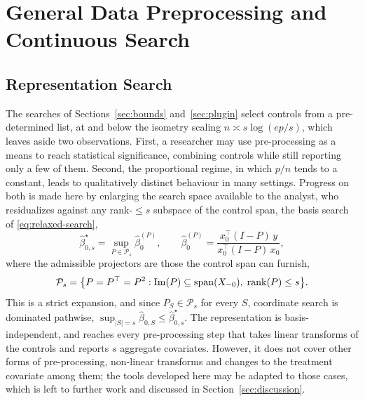 \section{General Data Preprocessing and Continuous Search}
\label{sec:continuous-relaxation}

%

\subsection{Representation Search}


The searches of Sections~\ref{sec:bounds} and~\ref{sec:plugin} select
controls from a pre-determined list, at and below the
isometry scaling $n \asymp s \log(ep/s)$, which leaves aside two
observations. First, a researcher may use pre-processing as a means to
reach statistical significance, combining controls while still reporting
only a few of them. Second, the proportional regime, in which $p/n$ tends
to a constant, leads to qualitatively distinct behaviour in many
settings. Progress on both is made here by enlarging the search space
available to the analyst, who residualizes against any rank-$\le s$
subspace of the control span, the basis search of
\eqref{eq:relaxed-search},
\begin{equation*}
        \hat\beta_{0,s}^\star = \sup_{P \in \mathcal{P}_s} \hat\beta_0^{(P)},
        \qquad
        \hat\beta_0^{(P)}
        = \frac{x_0^\top (I - P)\, y}{x_0^\top (I - P)\, x_0},
\end{equation*}
where the admissible projectors are those the control span can furnish,
\begin{equation*}
        \mathcal{P}_s
        = \big\{ P = P^\top = P^2 :
        \operatorname{Im}(P) \subseteq \operatorname{span}(X_{-0}),\;
        \operatorname{rank}(P) \le s \big\} .
\end{equation*}
This is a strict expansion, and since $P_S \in \mathcal{P}_s$ for every
$S$, coordinate search is dominated pathwise,
$\sup_{|S| = s} \hat\beta_{0,S} \le \hat\beta_{0,s}^\star$. The
representation is basis-independent, and reaches every pre-processing
step that takes linear transforms of the controls and reports $s$
aggregate covariates. However, it does not cover other forms of
pre-processing, non-linear transforms and changes to the treatment
covariate among them; the tools developed here may be adapted to those
cases, which is left to further work and discussed in
Section~\ref{sec:discussion}.

